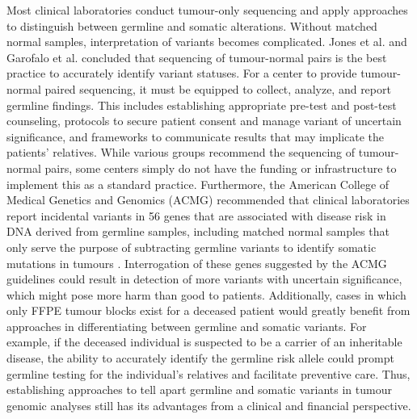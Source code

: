 Most clinical laboratories conduct tumour-only sequencing and apply approaches to distinguish between germline and somatic alterations. Without matched normal samples, interpretation of variants becomes complicated. Jones et al. \cite{Jones2015a} and Garofalo et al. \cite{Garofalo2016} concluded that sequencing of tumour-normal pairs is the best practice to accurately identify variant statuses. For a center to provide tumour-normal paired sequencing, it must be equipped to collect, analyze, and report germline findings. This includes establishing appropriate pre-test and post-test counseling, protocols to secure patient consent and manage variant of uncertain significance, and frameworks to communicate results that may implicate the patients' relatives. While various groups recommend the sequencing of tumour-normal pairs, some centers simply do not have the funding or infrastructure to implement this as a standard practice. Furthermore, the American College of Medical Genetics and Genomics (\acs{ACMG}) recommended that clinical laboratories report incidental variants in 56 genes that are associated with disease risk in DNA derived from germline samples, including matched normal samples that only serve the purpose of subtracting germline variants to identify somatic mutations in tumours \cite{Green2013}. Interrogation of these genes suggested by the ACMG guidelines could result in detection of more variants with uncertain significance, which might pose more harm than good to patients. Additionally, cases in which only FFPE tumour blocks exist for a deceased patient would greatly benefit from approaches in differentiating between germline and somatic variants. For example, if the deceased individual is suspected to be a carrier of an inheritable disease, the ability to accurately identify the germline risk allele could prompt germline testing for the individual's relatives and facilitate preventive care. Thus, establishing approaches to tell apart germline and somatic variants in tumour genomic analyses still has its advantages from a clinical and financial perspective.


